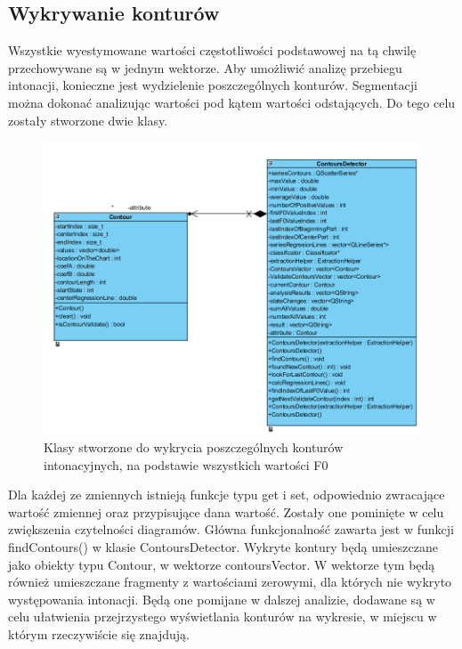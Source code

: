 \documentclass[a4paper,12 pt]{article}
\begin{document}
\subsection{Wykrywanie konturów}
Wszystkie wyestymowane wartości częstotliwości podstawowej na tą chwilę przechowywane są w jednym wektorze. Aby umożliwić analizę przebiegu intonacji, konieczne jest wydzielenie poszczególnych konturów. Segmentacji można dokonać analizując wartości pod kątem wartości odstających.
 Do tego celu zostały stworzone dwie klasy.
 \FloatBarrier
\begin{figure}[h]
\centering
\includegraphics[scale=0.9]{contourDetector.png}
\caption{Klasy stworzone do wykrycia poszczególnych konturów intonacyjnych, na podstawie wszystkich wartości F0}
\end{figure}
\FloatBarrier
Dla każdej ze zmiennych istnieją funkcje typu get i set, odpowiednio zwracające wartość zmiennej oraz przypisujące dana wartość. Zostały one pominięte w celu zwiększenia czytelności diagramów.
Główna funkcjonalność zawarta jest w funkcji findContours() w klasie ContoursDetector. Wykryte kontury będą umieszczane jako obiekty typu Contour, w wektorze contoursVector. W wektorze tym będą również umieszczane fragmenty z wartościami zerowymi, dla których nie wykryto występowania intonacji. Będą one pomijane w dalszej analizie, dodawane są w celu ułatwienia przejrzystego wyświetlania konturów na wykresie, w miejscu w którym rzeczywiście się znajdują.
\end{document}
